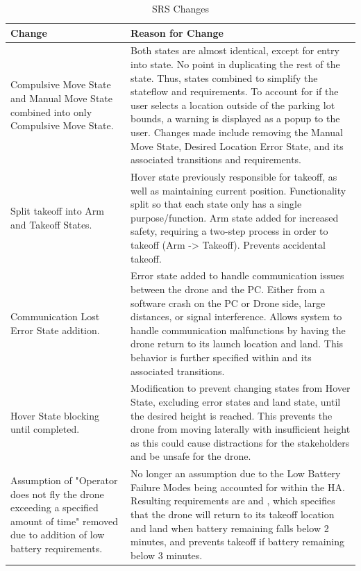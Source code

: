 \documentclass{article}
\begin{document}
\begin{table}[!h]
\begin{center}
\caption {SRS Changes}
\label{tab:SRS_Changes}
\begin{tabular}{ | m{4.7cm} | m{10.7cm} | } 
\hline
Change & Reason for Change \\ 
\hline
Compulsive Move State and Manual Move State combined into only Compulsive Move State. & 
    Both states are almost identical, except for entry into state. No point in duplicating the rest of the state. Thus, states combined to simplify the stateflow and requirements. To account for if the user selects a location outside of the parking lot bounds, a warning is displayed as a popup to the user. Changes made include removing the Manual Move State, Desired Location Error State, and its associated transitions and requirements.   \\ 
\hline
 Split takeoff into Arm and Takeoff States. &
    Hover state previously responsible for takeoff, as well as maintaining current position. Functionality split so that each state only has a single purpose/function.
	Arm state added for increased safety, requiring a two-step process in order to takeoff (Arm -> Takeoff). Prevents accidental takeoff.  \\
 \hline
 Communication Lost Error State addition. &
    Error state added to handle communication issues between the drone and the PC. Either from a software crash on the PC or Drone side, large distances, or signal interference. 
    Allows system to handle communication malfunctions by having the drone return to its launch location and land. This behavior is further specified within \nameref{STA_010} and its associated transitions. \\
\hline
Hover State blocking until completed. &
    Modification to prevent changing states from Hover State, excluding error states and land state, until the desired height is reached. This prevents the drone from moving laterally with insufficient height as this could cause distractions for the stakeholders and be unsafe for the drone. \\
\hline
Assumption of "Operator does not fly the drone exceeding a specified amount of time" removed due to addition of low battery requirements. &
    No longer an assumption due to the Low Battery Failure Modes being accounted for within the HA. Resulting requirements are \nameref{STC_011} and \nameref{STC_012}, which specifies that the drone will return to its takeoff location and land when battery remaining falls below 2 minutes, and prevents takeoff if battery remaining below 3 minutes. 

\end{tabular}
\end{center}
\end{table}
\end{document}
